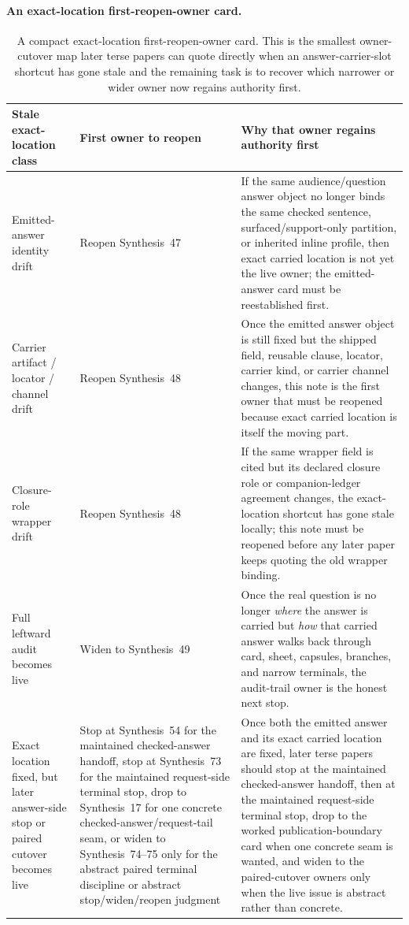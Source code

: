 \documentclass[11pt]{article}
\begin{document}
\paragraph{An exact-location first-reopen-owner card.}
\begin{table}[t]
\centering
\small
\begin{tabularx}{\linewidth}{@{}>{\raggedright\arraybackslash}X>{\raggedright\arraybackslash}X>{\raggedright\arraybackslash}X@{}}
\toprule
Stale exact-location class & First owner to reopen & Why that owner regains authority first \\
\midrule
Emitted-answer identity drift & Reopen Synthesis~47 & If the same audience/question answer object no longer binds the same checked sentence, surfaced/support-only partition, or inherited inline profile, then exact carried location is not yet the live owner; the emitted-answer card must be reestablished first. \\
Carrier artifact / locator / channel drift & Reopen Synthesis~48 & Once the emitted answer object is still fixed but the shipped field, reusable clause, locator, carrier kind, or carrier channel changes, this note is the first owner that must be reopened because exact carried location is itself the moving part. \\
Closure-role wrapper drift & Reopen Synthesis~48 & If the same wrapper field is cited but its declared closure role or companion-ledger agreement changes, the exact-location shortcut has gone stale locally; this note must be reopened before any later paper keeps quoting the old wrapper binding. \\
Full leftward audit becomes live & Widen to Synthesis~49 & Once the real question is no longer \emph{where} the answer is carried but \emph{how} that carried answer walks back through card, sheet, capsules, branches, and narrow terminals, the audit-trail owner is the honest next stop. \\
Exact location fixed, but later answer-side stop or paired cutover becomes live & Stop at Synthesis~54 for the maintained checked-answer handoff, stop at Synthesis~73 for the maintained request-side terminal stop, drop to Synthesis~17 for one concrete checked-answer/request-tail seam, or widen to Synthesis~74--75 only for the abstract paired terminal discipline or abstract stop/widen/reopen judgment & Once both the emitted answer and its exact carried location are fixed, later terse papers should stop at the maintained checked-answer handoff, then at the maintained request-side terminal stop, drop to the worked publication-boundary card when one concrete seam is wanted, and widen to the paired-cutover owners only when the live issue is abstract rather than concrete. \\
\bottomrule
\end{tabularx}
\caption{A compact exact-location first-reopen-owner card. This is the smallest owner-cutover map later terse papers can quote directly when an answer-carrier-slot shortcut has gone stale and the remaining task is to recover which narrower or wider owner now regains authority first.}
\label{tab:answer-carrier-slot-first-reopen-owner-card}
\end{table}
\end{document}
